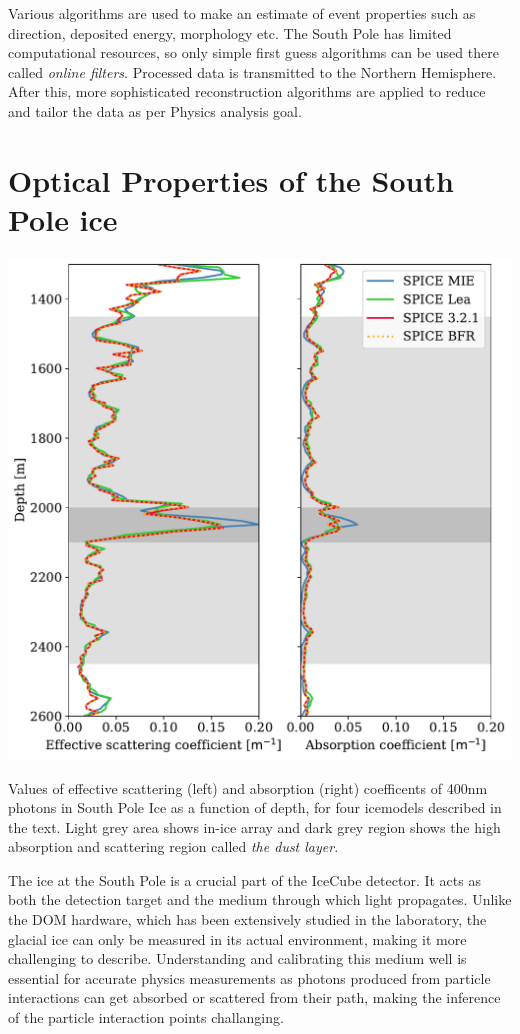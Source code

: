 Various algorithms are used to make an estimate of event properties such as direction, deposited energy, morphology etc. The South Pole has limited computational resources, so only simple first guess algorithms can be used there called \emph{online filters}. Processed data is transmitted to the Northern Hemisphere. After this, more sophisticated reconstruction algorithms are applied to reduce and tailor the data as per Physics analysis goal. 


\section{Optical Properties of the South Pole ice}
\label{sec:icemodel}
\begin{marginfigure}
	\centering \includegraphics{./figures/nu_in_icecube/abs_scat.pdf}
	\caption{Values of effective scattering (left) and absorption (right) coefficents of 400nm photons in South Pole Ice as a function of depth, for four icemodels described in the text. Light grey area shows in-ice array and dark grey region shows the high absorption and scattering region called \emph{the dust layer}.}
\end{marginfigure}
The ice at the South Pole is a crucial part of the IceCube detector. It acts as both the detection target and the medium through which light propagates. Unlike the DOM hardware, which has been extensively studied in the laboratory, the glacial ice can only be measured in its actual environment, making it more challenging to describe. Understanding and calibrating this medium well is essential for accurate physics measurements as photons produced from particle interactions can get absorbed or scattered from their path, making the inference of the particle interaction points challanging.

